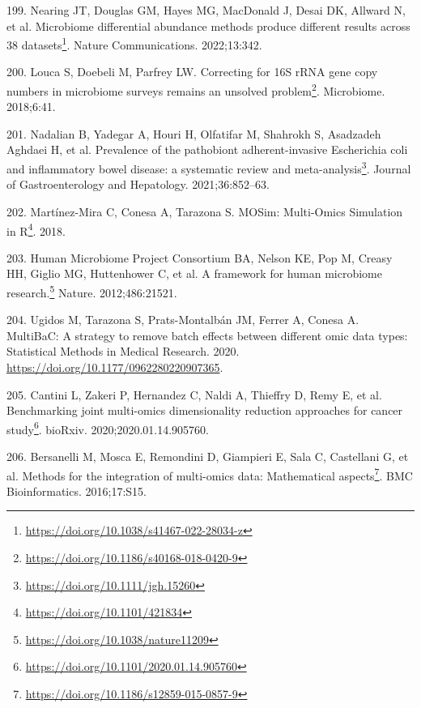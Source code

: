 \documentclass[
  a4paper,
]{book}
\DeclareRobustCommand{\href}[2]{#2\footnote{\url{#1}}}
\newlength{\cslhangindent}
\newlength{\cslentryspacingunit} %
\newenvironment{CSLReferences}[2] %
 {%
  \setlength{\parindent}{0pt}
  \ifodd #1
  \let\oldpar\par
  \def\par{\hangindent=\cslhangindent\oldpar}
  \fi
  \setlength{\parskip}{#2\cslentryspacingunit}
 }%
 {}
\begin{document}
\begin{CSLReferences}{0}{0}
\leavevmode{}%
199. Nearing JT, Douglas GM, Hayes MG, MacDonald J, Desai DK, Allward N, et al. \href{https://doi.org/10.1038/s41467-022-28034-z}{Microbiome differential abundance methods produce different results across 38 datasets}. Nature Communications. 2022;13:342.

\leavevmode{}%
200. Louca S, Doebeli M, Parfrey LW. \href{https://doi.org/10.1186/s40168-018-0420-9}{Correcting for 16S rRNA gene copy numbers in microbiome surveys remains an unsolved problem}. Microbiome. 2018;6:41.

\leavevmode{}%
201. Nadalian B, Yadegar A, Houri H, Olfatifar M, Shahrokh S, Asadzadeh Aghdaei H, et al. \href{https://doi.org/10.1111/jgh.15260}{Prevalence of the pathobiont adherent-invasive Escherichia coli and inflammatory bowel disease: a systematic review and meta-analysis}. Journal of Gastroenterology and Hepatology. 2021;36:852--63.

\leavevmode{}%
202. Martínez-Mira C, Conesa A, Tarazona S. \href{https://doi.org/10.1101/421834}{MOSim: Multi-Omics Simulation in R}. 2018.

\leavevmode{}%
203. Human Microbiome Project Consortium BA, Nelson KE, Pop M, Creasy HH, Giglio MG, Huttenhower C, et al. \href{https://doi.org/10.1038/nature11209}{A framework for human microbiome research.} Nature. 2012;486:21521.

\leavevmode{}%
204. Ugidos M, Tarazona S, Prats-Montalbán JM, Ferrer A, Conesa A. MultiBaC: A strategy to remove batch effects between different omic data types: Statistical Methods in Medical Research. 2020. \url{https://doi.org/10.1177/0962280220907365}.

\leavevmode{}%
205. Cantini L, Zakeri P, Hernandez C, Naldi A, Thieffry D, Remy E, et al. \href{https://doi.org/10.1101/2020.01.14.905760}{Benchmarking joint multi-omics dimensionality reduction approaches for cancer study}. bioRxiv. 2020;2020.01.14.905760.

\leavevmode{}%
206. Bersanelli M, Mosca E, Remondini D, Giampieri E, Sala C, Castellani G, et al. \href{https://doi.org/10.1186/s12859-015-0857-9}{Methods for the integration of multi-omics data: Mathematical aspects}. BMC Bioinformatics. 2016;17:S15.


\end{CSLReferences}
\end{document}
